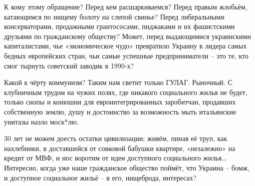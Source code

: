 К кому этому обращение? Перед кем расшаркиваемся? Перед правым жлобьём,
катающимся по нищему болоту на слепой свинье? Перед либеральными
консерваторами, продажными грантососами, пиджаками и их фашистскими друзьями по
гражданскому обществу? Может, перед выдающимися украинскими капиталистами, чье
«экономическое чудо» превратило Украину в лидера самых бедных европейских
стран, чьи самые успешные предприниматели – это те, кто смог тырнуть советский
заводик в 1990-х?

Какой к чёрту коммунизм? Таким нам светит только ГУЛАГ. Рыночный. С клубничным
трудом на чужих полях, где никакого социального жилья не будет, только снопы и
конюшни для евроинтегрированных заробитчан, продавших собственную землю, душу и
достоинство за возможность мыть итальянские унитазы назло моск*лю.

30 лет не можем доесть остатки цивилизации; живём, пиная её труп, как
нахлебники, в доставшейся от совковой бабушки квартире, «незалежно» на кредит
от МВФ, и нос воротим от идеи доступного социального жилья… Интересно, когда
уже наше гражданское общество поймёт, что Украина – бомж, и доступное
социальное жильё – в его, нищеброда, интересах?
